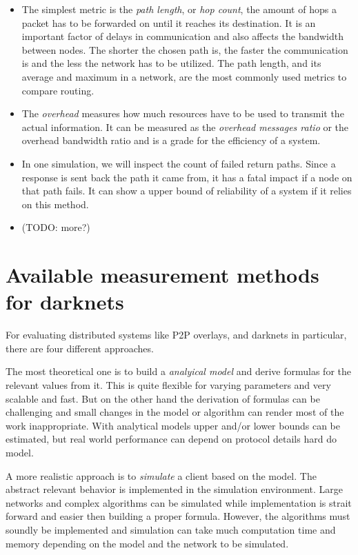\begin{itemize}
\item The simplest metric is the \emph{path length}, or \emph{hop count}, the amount of hops a packet has to be forwarded on until it reaches its destination. It is an important factor of delays in communication and also affects the bandwidth between nodes. The shorter the chosen path is, the faster the communication is and the less the network has to be utilized. The path length, and its average and maximum in a network, are the most commonly used metrics to compare routing.

\item The \emph{overhead} measures how much resources have to be used to transmit the actual information. It can be measured as the \emph{overhead messages ratio} or the overhead bandwidth ratio and is a grade for the efficiency of a system.

\item In one simulation, we will inspect the count of failed return paths. Since a response is sent back the path it came from, it has a fatal impact if a node on that path fails. It can show a upper bound of reliability of a system if it relies on this method.

\item (TODO: more?)
\end{itemize}

\section{Available measurement methods for darknets}

For evaluating distributed systems like P2P overlays, and darknets in particular, there are four different approaches.

The most theoretical one is to build a \emph{analyical model} and derive formulas for the relevant values from it. This is quite flexible for varying parameters and very scalable and fast. But on the other hand the derivation of formulas can be challenging and small changes in the model or algorithm can render most of the work inappropriate. With analytical models upper and/or lower bounds can be estimated, but real world performance can depend on protocol details hard do model.

A more realistic approach is to \emph{simulate} a client based on the model. The abstract relevant behavior is implemented in the simulation environment. Large networks and complex algorithms can be simulated while implementation is strait forward and easier then building a proper formula. However, the algorithms must soundly be implemented and simulation can take much computation time and memory depending on the model and the network to be simulated.

